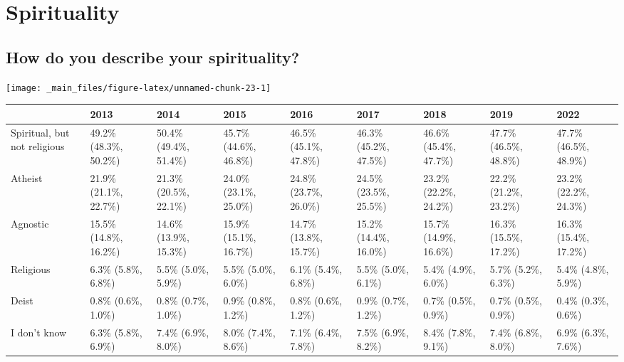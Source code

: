 \documentclass[
]{book}
\begin{document}
\hypertarget{spirituality}{%
\section{Spirituality}\label{spirituality}}

\hypertarget{how-do-you-describe-your-spirituality}{%
\subsection{How do you describe your spirituality?}\label{how-do-you-describe-your-spirituality}}

\texttt{[image: \_main\_files/figure-latex/unnamed-chunk-23-1]}

\begin{table}
\centering
\begin{tabular}[t]{>{}l|>{}l|>{}l|>{}l|>{}l|>{}l|>{}l|>{}l|>{}l}
\hline
  & 2013 & 2014 & 2015 & 2016 & 2017 & 2018 & 2019 & 2022\\
\hline
Spiritual, but 
 not religious & 49.2\% (48.3\%, 50.2\%) & 50.4\% (49.4\%, 51.4\%) & 45.7\% (44.6\%, 46.8\%) & 46.5\% (45.1\%, 47.8\%) & 46.3\% (45.2\%, 47.5\%) & 46.6\% (45.4\%, 47.7\%) & 47.7\% (46.5\%, 48.8\%) & 47.7\% (46.5\%, 48.9\%)\\
\hline
Atheist & 21.9\% (21.1\%, 22.7\%) & 21.3\% (20.5\%, 22.1\%) & 24.0\% (23.1\%, 25.0\%) & 24.8\% (23.7\%, 26.0\%) & 24.5\% (23.5\%, 25.5\%) & 23.2\% (22.2\%, 24.2\%) & 22.2\% (21.2\%, 23.2\%) & 23.2\% (22.2\%, 24.3\%)\\
\hline
Agnostic & 15.5\% (14.8\%, 16.2\%) & 14.6\% (13.9\%, 15.3\%) & 15.9\% (15.1\%, 16.7\%) & 14.7\% (13.8\%, 15.7\%) & 15.2\% (14.4\%, 16.0\%) & 15.7\% (14.9\%, 16.6\%) & 16.3\% (15.5\%, 17.2\%) & 16.3\% (15.4\%, 17.2\%)\\
\hline
Religious & 6.3\% (5.8\%, 6.8\%) & 5.5\% (5.0\%, 5.9\%) & 5.5\% (5.0\%, 6.0\%) & 6.1\% (5.4\%, 6.8\%) & 5.5\% (5.0\%, 6.1\%) & 5.4\% (4.9\%, 6.0\%) & 5.7\% (5.2\%, 6.3\%) & 5.4\% (4.8\%, 5.9\%)\\
\hline
Deist & 0.8\% (0.6\%, 1.0\%) & 0.8\% (0.7\%, 1.0\%) & 0.9\% (0.8\%, 1.2\%) & 0.8\% (0.6\%, 1.2\%) & 0.9\% (0.7\%, 1.2\%) & 0.7\% (0.5\%, 0.9\%) & 0.7\% (0.5\%, 0.9\%) & 0.4\% (0.3\%, 0.6\%)\\
\hline
I don't know & 6.3\% (5.8\%, 6.9\%) & 7.4\% (6.9\%, 8.0\%) & 8.0\% (7.4\%, 8.6\%) & 7.1\% (6.4\%, 7.8\%) & 7.5\% (6.9\%, 8.2\%) & 8.4\% (7.8\%, 9.1\%) & 7.4\% (6.8\%, 8.0\%) & 6.9\% (6.3\%, 7.6\%)\\
\hline
\end{tabular}
\end{table}
\end{document}
